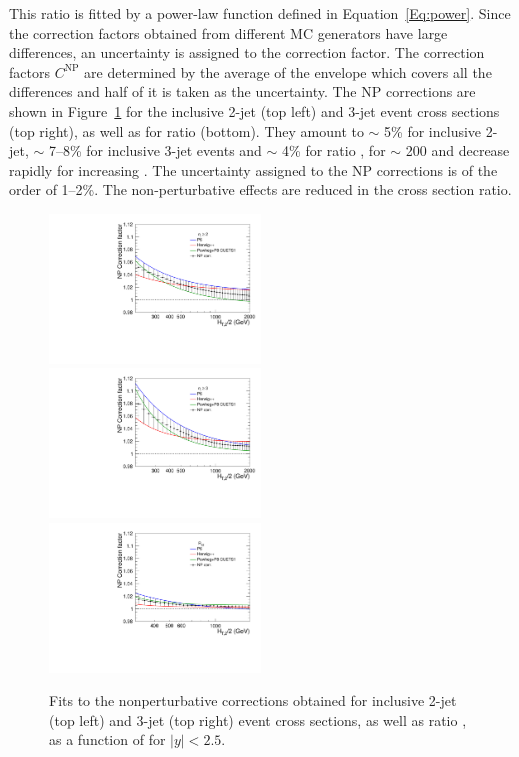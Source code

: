 This ratio is fitted by a power-law function defined in Equation~\ref{Eq:power}. 
Since the correction factors obtained from different MC generators have 
large differences, an uncertainty is assigned to the correction factor. The correction
factors $C^{\mathrm{NP}}$ are determined by the average of the envelope
which covers all the differences and half of it is taken as the uncertainty.
The NP corrections are shown in Figure~\ref{fig:np_factors} for the inclusive 2-jet (top left) and 3-jet event cross sections
(top right), as well as for ratio \ratio (bottom). They amount to $\sim$ 5\% for inclusive 2-jet,
$\sim$ 7--8\% for inclusive 3-jet events and $\sim$ 4\% for ratio \ratio, for \httwo $\sim$ 200\GeV
and decrease rapidly for increasing \httwo. The uncertainty assigned
to the NP corrections is of the order of 1--2\%. The non-perturbative effects are reduced in the cross section ratio.

\begin{figure}[!htbp]
\begin{center}
  \includegraphics[width=0.5\textwidth]{Plots_HT_2_150/Final_NP_Corr_2.pdf}%
  \includegraphics[width=0.5\textwidth]{Plots_HT_2_150/Final_NP_Corr_3.pdf}\\
  \includegraphics[width=0.5\textwidth]{Plots_HT_2_150/Final_NP_Corr_Ratio_32.pdf}
  \caption{Fits to the nonperturbative corrections obtained for
    inclusive 2-jet (top left) and 3-jet (top right) event cross
    sections, as well as ratio \ratio, as a function of \httwo for $|y|<2.5$.}
  \label{fig:np_factors}
\end{center}
\end{figure}

